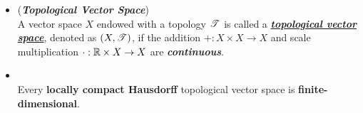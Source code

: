 \documentclass[11pt]{article}
\begin{document}
\begin{itemize}
\item \begin{definition} (\emph{\textbf{Topological Vector Space}})\\
A vector space $X$ endowed with a topology ${\mathscr T}$ is called a \underline{\emph{\textbf{topological vector space}}}, denoted as $(X, {\mathscr T})$, if the addition $+: X\times X \rightarrow X$ and scale multiplication $\cdot: {\mathbb R}\times X \rightarrow X$ are \emph{\textbf{continuous}}. 
\end{definition}

 \item \begin{theorem} \citep{treves2016topological}\\
 Every \textbf{locally compact Hausdorff} topological vector space is \textbf{finite-dimensional}.
 \end{theorem}
\end{itemize}
\end{document}
